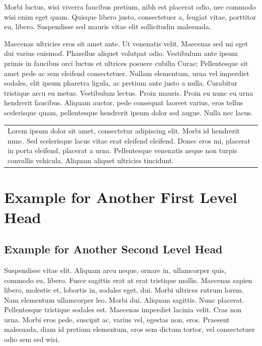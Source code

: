 \documentclass[ASNA,twocolumn]{USG} %
\begin{document}
{Morbi luctus, wisi viverra faucibus pretium, nibh est placerat odio, nec commodo wisi enim eget quam. Quisque
libero justo, consectetuer a, feugiat vitae, porttitor eu, libero. Suspendisse sed mauris vitae elit sollicitudin malesuada.

Maecenas ultricies eros sit amet ante. Ut venenatis velit. Maecenas sed mi eget dui varius euismod. Phasellus aliquet
volutpat odio. Vestibulum ante ipsum primis in faucibus orci luctus et ultrices posuere cubilia Curae; Pellentesque sit
amet pede ac sem eleifend consectetuer. Nullam elementum, urna vel imperdiet sodales, elit ipsum pharetra ligula,
ac pretium ante justo a nulla. Curabitur tristique arcu eu metus. Vestibulum lectus. Proin mauris. Proin eu nunc eu
urna hendrerit faucibus. Aliquam auctor, pede consequat laoreet varius, eros tellus scelerisque quam, pellentesque
hendrerit ipsum dolor sed augue. Nulla nec lacus.

\vspace{10pt}

{\setlength\arrayrulewidth{5pt}
\begin{tabular}{|p{230pt}}
Lorem ipsum dolor sit amet, consectetur adipiscing elit. Morbi id hendrerit nunc. Sed scelerisque lacus vitae erat eleifend eleifend. Donec eros mi, placerat in porta eleifend, placerat a urna. Pellentesque venenatis neque non turpis convallis vehicula. Aliquam aliquet ultricies tincidunt.
\end{tabular}}

\section{Example for Another First Level Head}\label{sec3}

\subsection{Example for Another Second Level Head}

Suspendisse vitae elit. Aliquam arcu neque, ornare in, ullamcorper quis, commodo eu, libero. Fusce sagittis erat at
erat tristique mollis. Maecenas sapien libero, molestie et, lobortis in, sodales eget, dui. Morbi ultrices rutrum lorem.
Nam elementum ullamcorper leo. Morbi dui. Aliquam sagittis. Nunc placerat. Pellentesque tristique sodales est.
Maecenas imperdiet lacinia velit. Cras non urna. Morbi eros pede, suscipit ac, varius vel, egestas non, eros. Praesent
malesuada, diam id pretium elementum, eros sem dictum tortor, vel consectetuer odio sem sed wisi.

}
\end{document}
